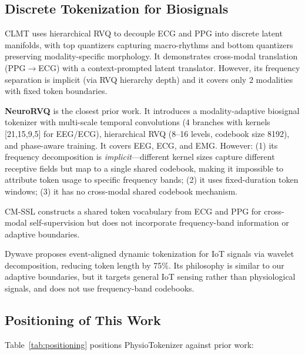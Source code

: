 \documentclass[letterpaper]{article}
\begin{document}
\subsection{Discrete Tokenization for Biosignals}

CLMT \cite{cui2026clmt} uses hierarchical RVQ to decouple ECG and PPG into
discrete latent manifolds, with top quantizers capturing macro-rhythms and
bottom quantizers preserving modality-specific morphology. It demonstrates
cross-modal translation (PPG$\rightarrow$ECG) with a context-prompted latent
translator. However, its frequency separation is implicit (via RVQ hierarchy
depth) and it covers only 2 modalities with fixed token boundaries.

\textbf{NeuroRVQ} \cite{barmpas2025neurorvq} is the closest prior work.
It introduces a modality-adaptive biosignal tokenizer with multi-scale
temporal convolutions (4 branches with kernels [21,15,9,5] for EEG/ECG),
hierarchical RVQ (8--16 levels, codebook size 8192), and phase-aware
training. It covers EEG, ECG, and EMG. However: (1) its frequency
decomposition is \textit{implicit}---different kernel sizes capture
different receptive fields but map to a single shared codebook, making it
impossible to attribute token usage to specific frequency bands; (2) it uses
fixed-duration token windows; (3) it has no cross-modal shared codebook
mechanism.

CM-SSL \cite{cmssl2026} constructs a shared token vocabulary from ECG and PPG
for cross-modal self-supervision but does not incorporate frequency-band
information or adaptive boundaries.

Dywave \cite{dywave2026} proposes event-aligned dynamic tokenization for IoT
signals via wavelet decomposition, reducing token length by 75\%. Its
philosophy is similar to our adaptive boundaries, but it targets general IoT
sensing rather than physiological signals, and does not use frequency-band
codebooks.

\subsection{Positioning of This Work}

Table~\ref{tab:positioning} positions PhysioTokenizer against prior work:
\end{document}

